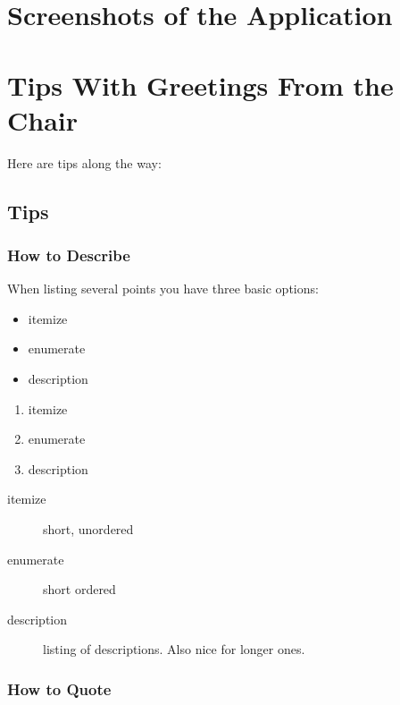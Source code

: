 \documentclass[
			   fontsize=11pt,
               paper=a4,
               bibliography=totoc,
               idxtotoc,
               headsepline,
               footsepline,
               footinclude=false,
               BCOR=12mm,
               DIV=13,
               openany,   %
               ]
               {scrbook}
\begin{document}
\appendix

\chapter{Screenshots of the Application}

\chapter{Tips With Greetings From the Chair}
\label{sec:tips}       %
Here are tips along the way:

\section{Tips}
\subsection{How to Describe}
\setlength{\columnsep}{30 pt}
When listing several points you have three basic options:
\begin{multicols}{3}
	\begin{itemize}
		\item itemize
		\item enumerate
		\item description
	\end{itemize}
	
	\vfill\null
	\columnbreak
	
	\begin{enumerate}
		\item itemize
		\item enumerate
		\item description
	\end{enumerate}
	
	\vfill\null
	\columnbreak
	
	\begin{description}
		\item[itemize] short, unordered
		\item[enumerate] short ordered
		\item[description] listing of descriptions. Also nice for longer ones.
	\end{description}
	
\end{multicols}


\subsection{How to Quote}
\end{document}
